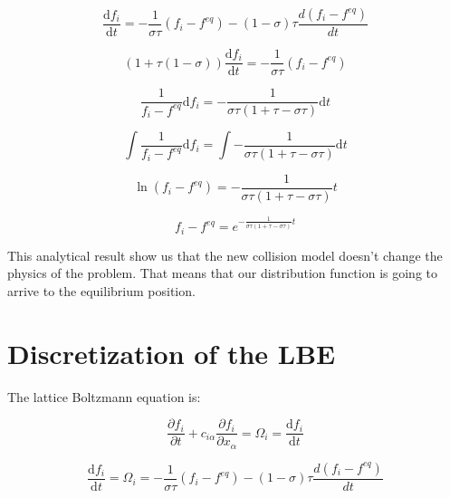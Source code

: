 \documentclass{article}
\begin{document}
\begin{equation}
    \frac{\mathrm{d} f_{i}}{\mathrm{d} t}= -\frac{1}{\sigma\tau}(f_i-f^{eq}) - (1-\sigma)\tau\frac{d(f_i-f^{eq})}{dt}
\end{equation}

\begin{equation*}
    \left(1 + \tau(1-\sigma)\right)\frac{\mathrm{d} f_{i}}{\mathrm{d} t}= -\frac{1}{\sigma\tau}(f_i-f^{eq}) 
\end{equation*}

\begin{equation*}
    \frac{1}{f_i-f^{eq}}\mathrm{d} f_{i}= -\frac{1}{\sigma\tau(1+\tau-\sigma\tau)}\mathrm{d} t 
\end{equation*}

\begin{equation*}
    \int\frac{1}{f_i-f^{eq}}\mathrm{d} f_{i}= \int -\frac{1}{\sigma\tau(1+\tau-\sigma\tau)}\mathrm{d} t 
\end{equation*}

\begin{equation*}
    \ln{(f_i-f^{eq})}= -\frac{1}{\sigma\tau(1+\tau-\sigma\tau)}t
\end{equation*}

\begin{equation*}
    f_i-f^{eq}= e^{-\frac{1}{\sigma\tau(1+\tau-\sigma\tau)}t} 
\end{equation*}

This analytical result show us that the new collision model doesn't change the physics of the problem.
That means that our distribution function is going to arrive to the equilibrium position.

\section{Discretization of the LBE}

The lattice Boltzmann equation is: 

\begin{equation}
    \frac{\partial f_{i}}{\partial t} +c_{i\alpha }\frac{\partial f_{i}}{\partial x_{\alpha }} =\Omega _{i} =\frac{\mathrm{d} f_{i}}{\mathrm{d} t}
\end{equation}

\begin{equation}
    \frac{\mathrm{d} f_{i}}{\mathrm{d} t}=\Omega _{i}=-\frac{1}{\sigma\tau}(f_i-f^{eq}) - (1-\sigma)\tau\frac{d(f_i-f^{eq})}{dt} 
\end{equation}
\end{document}

